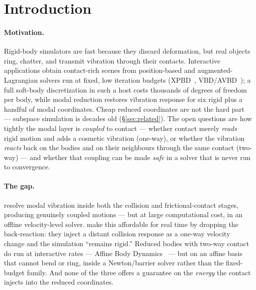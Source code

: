 \section{Introduction}
\label{sec:intro}

\paragraph*{Motivation.} Rigid-body simulators are fast because they discard
deformation, but real objects ring, chatter, and transmit vibration through their
contacts. Interactive applications obtain contact-rich scenes from position-based
and augmented-Lagrangian solvers run at fixed, low iteration budgets
(XPBD~\citep{macklin2016xpbd}, VBD/AVBD~\citep{chen2024vbd,giles2025avbd}); a
full soft-body discretization in such a host costs thousands of degrees of
freedom per body, while modal reduction restores vibration response for six
rigid plus a handful of modal coordinates. Cheap reduced coordinates are not
the hard part --- subspace simulation is decades old (\S\ref{sec:related}). The
open questions are how tightly the modal layer is \emph{coupled} to contact ---
whether contact merely \emph{reads} rigid motion and adds a cosmetic vibration
(one-way), or whether the vibration \emph{reacts} back on the bodies and on
their neighbours through the same contact (two-way) --- and whether that
coupling can be made \emph{safe} in a solver that is never run to convergence.

\paragraph*{The gap.} \citet{zheng2011} resolve modal vibration inside both the
collision and frictional-contact stages, producing genuinely coupled motions --- but
at large computational cost, in an offline velocity-level solver.
\citet{coevoet2020distant} make this affordable for real time by dropping the
back-reaction: they inject a distant collision response as a one-way velocity change
and the simulation ``remains rigid.'' Reduced bodies with two-way contact do run
at interactive rates --- Affine Body Dynamics~\citep{lan2022abd} --- but on an
affine basis that cannot bend or ring, inside a Newton/barrier solver rather
than the fixed-budget family. And none of the three offers a guarantee on the
\emph{energy} the contact injects into the reduced coordinates.

